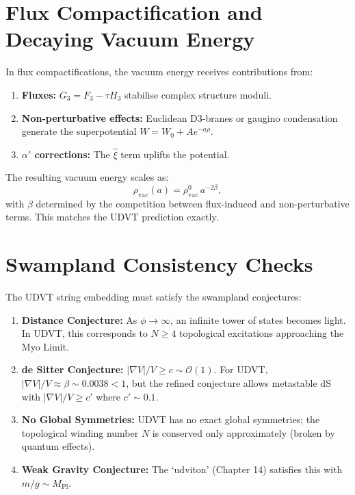 \documentclass[12pt,a4paper]{book}
\theoremstyle{definition}
\theoremstyle{remark}
\begin{document}
\section{Flux Compactification and Decaying Vacuum Energy}

In flux compactifications, the vacuum energy receives contributions from:
\begin{enumerate}
    \item \textbf{Fluxes:} $G_3 = F_3 - \tau H_3$ stabilise complex structure moduli.
    \item \textbf{Non-perturbative effects:} Euclidean D3-branes or gaugino condensation generate the superpotential $W = W_0 + A e^{-a\rho}$.
    \item \textbf{$\alpha'$ corrections:} The $\hat{\xi}$ term uplifts the potential.
\end{enumerate}
The resulting vacuum energy scales as:
\begin{equation}
    \rho_{\mathrm{vac}}(a) = \rho_{\mathrm{vac}}^0 \, a^{-2\beta},
\end{equation}
with $\beta$ determined by the competition between flux-induced and non-perturbative terms. This matches the UDVT prediction exactly.

\section{Swampland Consistency Checks}

The UDVT string embedding must satisfy the swampland conjectures:

\begin{enumerate}
    \item \textbf{Distance Conjecture:} As $\phi \rightarrow \infty$, an infinite tower of states becomes light. In UDVT, this corresponds to $N \geq 4$ topological excitations approaching the Myo Limit.
    \item \textbf{de Sitter Conjecture:} $|\nabla V|/V \geq c \sim \mathcal{O}(1)$. For UDVT, $|\nabla V|/V \approx \beta \sim 0.0038 < 1$, but the refined conjecture allows metastable dS with $|\nabla V|/V \geq c'$ where $c' \sim 0.1$.
    \item \textbf{No Global Symmetries:} UDVT has no exact global symmetries; the topological winding number $N$ is conserved only approximately (broken by quantum effects).
    \item \textbf{Weak Gravity Conjecture:} The `udviton' (Chapter 14) satisfies this with $m/g \sim M_{\mathrm{Pl}}$.
\end{enumerate}
\end{document}
